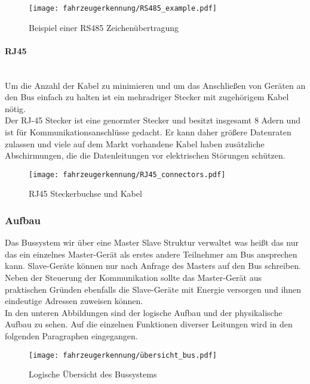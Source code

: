 \begin{figure}[H]
    \centering
    \texttt{[image: fahrzeugerkennung/RS485\_example.pdf]}
    \caption{Beispiel einer RS485 Zeichenübertragung}
\end{figure}

\paragraph{RJ45}\mbox{}\\
Um die Anzahl der Kabel zu minimieren und um das Anschließen von Geräten an den Bus einfach zu halten ist ein
mehradriger Stecker mit zugehörigem Kabel nötig.\\
Der RJ-45 Stecker ist eine genormter Stecker und besitzt insgesamt 8 Adern und ist für Kommunikationsanschlüsse gedacht. Er kann daher größere Datenraten zulassen und viele auf dem
Markt vorhandene Kabel haben zusätzliche Abschirmungen, die die Datenleitungen vor elektrischen Störungen schützen. 

\begin{figure}[H]
    \centering
    \texttt{[image: fahrzeugerkennung/RJ45\_connectors.pdf]}
    \caption{RJ45 Steckerbuchse und Kabel}
\end{figure}



\subsubsection{Aufbau}

Das Bussystem wir über eine Master Slave Struktur verwaltet was heißt das nur das ein einzelnes Master-Gerät als erstes andere Teilnehmer am Bus ansprechen kann.
Slave-Geräte können nur nach Anfrage des Masters auf den Bus schreiben. Neben der Steuerung der Kommunikation sollte das Master-Gerät aus praktischen Gründen ebenfalls die Slave-Geräte
mit Energie versorgen und ihnen eindeutige Adressen zuweisen können. \\

In den unteren Abbildungen sind der logische Aufbau und der physikalische Aufbau zu sehen.
Auf die einzelnen Funktionen diverser Leitungen wird in den folgenden Paragraphen eingegangen.

\begin{figure}[H]
    \centering
    \texttt{[image: fahrzeugerkennung/übersicht\_bus.pdf]}
    \caption{Logische Übersicht des Bussystems}
\end{figure}

